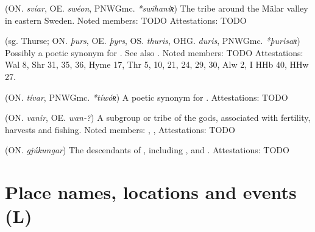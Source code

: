 \begin{itemize}
 (ON. \emph{svíar}, OE. \emph{swéon}, PNWGmc. \emph{*swihaníʀ})
  The tribe around the Mälar valley in eastern Sweden.
  Noted members: TODO
  Attestations: TODO

 (sg. Thurse; ON. \emph{þurs}, OE. \emph{þyrs}, OS. \emph{thuris}, OHG. \emph{duris}, PNWGmc. \emph{*þurisaʀ})
  Possibly a poetic synonym for . See also .
  Noted members: TODO
  Attestations: Wal 8, Shr 31, 35, 36, Hyme 17, Thr 5, 10, 21, 24, 29, 30, Alw 2, I HHb 40, HHw 27.

 (ON. \emph{tívar}, PNWGmc. \emph{*tíwóʀ})
  A poetic synonym for .
  Attestations: TODO

 (ON. \emph{vanir}, OE. \emph{wan-?})
  A subgroup or tribe of the gods, associated with fertility, harvests and fishing.
  Noted members: , , 
  Attestations: TODO

 (ON. \emph{gjúkungar})
  The descendants of , including ,  and .
  Attestations: TODO

\end{itemize}


\section{Place names, locations and events (L)}

